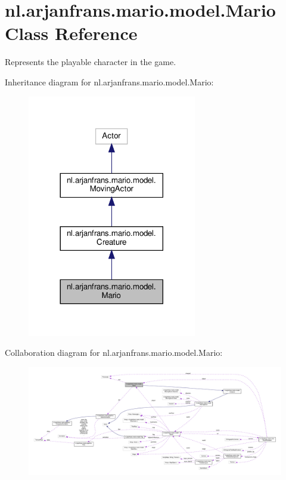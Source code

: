 \hypertarget{classnl_1_1arjanfrans_1_1mario_1_1model_1_1Mario}{}\section{nl.\+arjanfrans.\+mario.\+model.\+Mario Class Reference}
\label{classnl_1_1arjanfrans_1_1mario_1_1model_1_1Mario}


Represents the playable character in the game.  




Inheritance diagram for nl.\+arjanfrans.\+mario.\+model.\+Mario\+:
\nopagebreak
\begin{figure}[H]
\begin{center}
\leavevmode
\includegraphics[width=209pt]{classnl_1_1arjanfrans_1_1mario_1_1model_1_1Mario__inherit__graph}
\end{center}
\end{figure}


Collaboration diagram for nl.\+arjanfrans.\+mario.\+model.\+Mario\+:
\nopagebreak
\begin{figure}[H]
\begin{center}
\leavevmode
\includegraphics[width=350pt]{classnl_1_1arjanfrans_1_1mario_1_1model_1_1Mario__coll__graph}
\end{center}
\end{figure}
